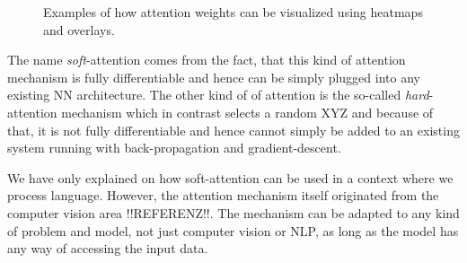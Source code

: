 \begin{figure}[h]
	\caption{Examples of how attention weights can be visualized using heatmaps and overlays.}
	\label{fundamentals:seq2seq:attention_weights_visualization}
\end{figure}

The name \emph{soft}-attention comes from the fact, that this kind of attention mechanism is fully differentiable and hence can be simply plugged into any existing NN architecture. The other kind of of attention is the so-called \emph{hard}-attention mechanism which in contrast selects a random XYZ and because of that, it is not fully differentiable and hence cannot simply be added to an existing system running with back-propagation and gradient-descent.

We have only explained on how soft-attention can be used in a context where we process language. However, the attention mechanism itself originated from the computer vision area !!REFERENZ!!. The mechanism can be adapted to any kind of problem and model, not just computer vision or NLP, as long as the model has any way of accessing the input data.

